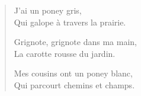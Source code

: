 \documentclass{article}
\begin{document}
    \begin{verse}
        J'ai un poney gris, \\
        Qui galope à travers la prairie.

        Grignote, grignote dans ma main, \\
        La carotte rousse du jardin.

        Mes cousins ont un poney blanc, \\
        Qui parcourt chemins et champs.
    \end{verse}
\end{document}
